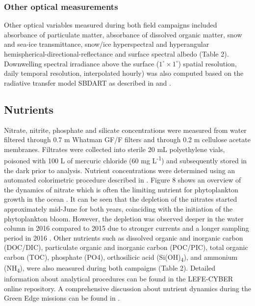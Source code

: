 \documentclass[essd, manuscript]{copernicus}
\begin{document}
\subsubsection{Other optical measurements}

Other optical variables measured during both field campaigns included absorbance of particulate matter, absorbance of dissolved organic matter, snow and sea-ice transmittance, snow/ice hyperspectral and hyperangular hemispherical-directional-reflectance \citep{Goyens2018} and surface spectral albedo (Table 2). Downwelling spectral irradiance above the surface ($1^{\circ} \times 1^{\circ}$) spatial resolution, daily temporal resolution, interpolated hourly) was also computed based on the radiative transfer model SBDART \citep{Ricchiazzi1998} as described in \citet{Laliberte2016} and \citet{Randelhoff2019}.

\subsection{Nutrients}

Nitrate, nitrite, phosphate and silicate concentrations were measured from water filtered through 0.7 \textmu m Whatman GF/F filters and through 0.2 \textmu m cellulose acetate membranes. Filtrates were collected into sterile 20 mL polyethylene vials, poisoned with 100 \textmu L of mercuric chloride (60 mg L\textsuperscript{-1}) and subsequently stored in the dark prior to analysis. Nutrient concentrations were determined using an automated colorimetric procedure described in \citet{Aminot2007}. Figure 8 shows an overview of the dynamics of nitrate which is often the limiting nutrient for phytoplankton growth in the ocean \citep{Tremblay2009}. It can be seen that the depletion of the nitrates started approximately mid-June for both years, coinciding with the initiation of the phytoplankton bloom. However, the depletion was observed deeper in the water column in 2016 compared to 2015 due to stronger currents and a longer sampling period in 2016 \citep{Oziel2019}. Other nutrients such as dissolved organic and inorganic carbon (DOC/DIC), particulate organic and inorganic carbon (POC/PIC), total organic carbon (TOC), phosphate (PO4), orthosilicic acid (Si(OH)\textsubscript{4}), and ammonium (NH\textsubscript{4}), were also measured during both campaigns (Table 2). Detailed information about analytical procedures can be found in the LEFE-CYBER online repository. A comprehensive discussion about nutrient dynamics during the Green Edge missions can be found in \citet{Grondin2019}.
\end{document}
